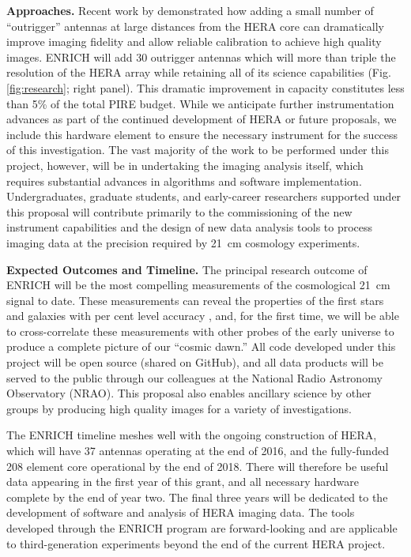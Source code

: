 \documentclass[preprint,11pt]{aastex}
\begin{document}
\vspace{8pt}
\textbf{Approaches.} Recent work by \cite{dillon_and_parsons_2016} demonstrated how adding a small number of ``outrigger” antennas at large distances from the HERA core can dramatically improve imaging fidelity and allow reliable calibration to achieve high quality images.  ENRICH will add 30 outrigger antennas which will more than triple the resolution of the HERA array while retaining all of its science capabilities (Fig. \ref{fig:research}; right panel).  This dramatic improvement in capacity constitutes less than 5\% of the total PIRE budget.  While we anticipate further instrumentation advances as part of the continued development of HERA or future proposals, we include this hardware element to ensure the necessary instrument for the success of this investigation.  The vast majority of the work to be performed under this project, however, will be in undertaking the imaging analysis itself, which requires substantial advances in algorithms and software implementation.  Undergraduates, graduate students, and early-career researchers supported under this proposal will contribute primarily to the commissioning of the new instrument capabilities and the design of new data analysis tools to process imaging data at the precision required by 21\, cm cosmology experiments.

\vspace{8pt}
\textbf{Expected Outcomes and Timeline.} The principal research outcome of ENRICH will be the most compelling measurements of the cosmological 21\, cm signal to date.  These measurements can reveal the properties of the first stars and galaxies with per cent level accuracy \citep{pober_et_al_2014,greig_and_mesinger_2015,ewall-wice_et_al_2016}, and, for the first time, we will be able to cross-correlate these measurements with other probes of the early universe to produce a complete picture of our ``cosmic dawn.”  All code developed under this project will be open source (shared on GitHub), and all data products will be served to the public through our colleagues at the National Radio Astronomy Observatory (NRAO).  This proposal also enables ancillary science by other groups by producing high quality images for a variety of investigations.

The ENRICH timeline meshes well with the ongoing construction of HERA, which will have 37 antennas operating at the end of 2016, and the fully-funded 208 element core operational by the end of 2018.  There will therefore be useful data appearing in the first year of this grant, and all necessary hardware complete by the end of year two.  The final three years will be dedicated to the development of software and analysis of HERA imaging data.  The tools developed through the ENRICH program are forward-looking and are applicable to third-generation experiments beyond the end of the current HERA project.
\end{document}
